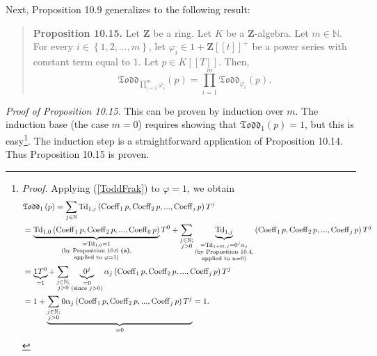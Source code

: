 \documentclass[numbers=enddot,12pt,final,onecolumn,notitlepage]{scrartcl}%
\begin{document}
Next, Proposition 10.9 generalizes to the following result:

\begin{quote}
\textbf{Proposition 10.15.} Let $\mathbf{Z}$ be a ring. Let $K$ be a
$\mathbf{Z}$-algebra. Let $m\in\mathbb{N}$. For every $i\in\left\{
1,2,...,m\right\}  $, let $\varphi_{i}\in1+\mathbf{Z}\left[  \left[  t\right]
\right]  ^{+}$ be a power series with constant term equal to $1$. Let $p\in
K\left[  \left[  T\right]  \right]  $. Then,%
\[
\mathfrak{Todd}_{\prod\limits_{i=1}^{m}\varphi_{i}}\left(  p\right)
=\prod\limits_{i=1}^{m}\mathfrak{Todd}_{\varphi_{i}}\left(  p\right)  .
\]



\end{quote}

\textit{Proof of Proposition 10.15.} This can be proven by induction over $m$.
The induction base (the case $m=0$) requires showing that $\mathfrak{Todd}%
_{1}\left(  p\right)  =1$, but this is easy\footnote{\textit{Proof.} Applying
(\ref{ToddFrak}) to $\varphi=1$, we obtain%
\begin{align*}
&  \mathfrak{Todd}_{1}\left(  p\right)  =\sum\limits_{j\in\mathbb{N}%
}\operatorname*{Td}\nolimits_{1,j}\left(  \operatorname*{Coeff}\nolimits_{1}%
p,\operatorname*{Coeff}\nolimits_{2}p,...,\operatorname*{Coeff}\nolimits_{j}%
p\right)  T^{j}\\
&  =\underbrace{\operatorname*{Td}\nolimits_{1,0}\left(  \operatorname*{Coeff}%
\nolimits_{1}p,\operatorname*{Coeff}\nolimits_{2}p,...,\operatorname*{Coeff}%
\nolimits_{0}p\right)  }_{\substack{=\operatorname*{Td}\nolimits_{1,0}%
=1\\\text{(by Proposition 10.6 \textbf{(a)},}\\\text{applied to }%
\varphi=1\text{)}}}T^{0}+\sum_{\substack{j\in\mathbb{N};\\j>0}%
}\underbrace{\operatorname*{Td}\nolimits_{1,j}}_{\substack{=\operatorname*{Td}%
\nolimits_{1+0t,j}=0^{j}\alpha_{j}\\\text{(by Proposition 10.4,}%
\\\text{applied to }u=0\text{)}}}\left(  \operatorname*{Coeff}\nolimits_{1}%
p,\operatorname*{Coeff}\nolimits_{2}p,...,\operatorname*{Coeff}\nolimits_{j}%
p\right)  T^{j}\\
&  =\underbrace{1T^{0}}_{=1}+\sum_{\substack{j\in\mathbb{N};\\j>0}%
}\underbrace{0^{j}}_{\substack{=0\\\text{(since }j>0\text{)}}}\alpha
_{j}\left(  \operatorname*{Coeff}\nolimits_{1}p,\operatorname*{Coeff}%
\nolimits_{2}p,...,\operatorname*{Coeff}\nolimits_{j}p\right)  T^{j}\\
&  =1+\underbrace{\sum_{\substack{j\in\mathbb{N};\\j>0}}0\alpha_{j}\left(
\operatorname*{Coeff}\nolimits_{1}p,\operatorname*{Coeff}\nolimits_{2}%
p,...,\operatorname*{Coeff}\nolimits_{j}p\right)  T^{j}}_{=0}=1.
\end{align*}
}. The induction step is a straightforward application of Proposition 10.14.
Thus Proposition 10.15 is proven.
\end{document}
